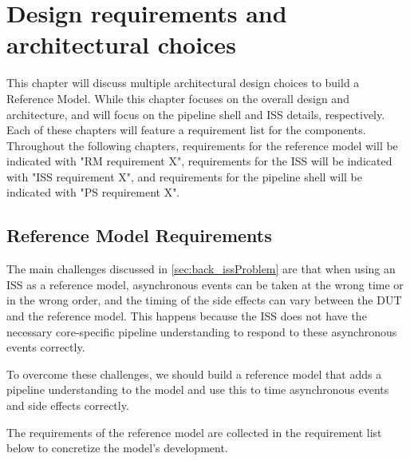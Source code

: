 \chapter{Design requirements and architectural choices}
\label{ch:design}


This chapter will discuss multiple architectural design choices to build a Reference Model. While this chapter focuses on the overall design and architecture,  and  will focus on the pipeline shell and ISS details, respectively. Each of these chapters will feature a requirement list for the components. Throughout the following chapters, requirements for the reference model will be indicated with "RM requirement X", requirements for the ISS will be indicated with "ISS requirement X", and requirements for the pipeline shell will be indicated with "PS requirement X". 

\section{Reference Model Requirements}
\label{sec:rm_req}

The main challenges discussed in \cref{sec:back_issProblem} are that when using an ISS as a reference model, asynchronous events can be taken at the wrong time or in the wrong order, and the timing of the side effects can vary between the DUT and the reference model. This happens because the ISS does not have the necessary core-specific pipeline understanding to respond to these asynchronous events correctly.

To overcome these challenges, we should build a reference model that adds a pipeline understanding to the model and use this to time asynchronous events and side effects correctly.

The requirements of the reference model are collected in the requirement list below to concretize the model's development.


